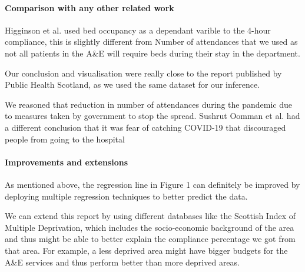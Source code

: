 \documentclass[11pt,a4paper]{article}
\begin{document}
\paragraph{Comparison with any other related work}
Higginson et al. \cite{higginson} used bed occupancy as a dependant varible to the 4-hour compliance, this is slightly different from Number of attendances that we used as not all patients in the A\&E will require beds during their stay in the department.

Our conclusion and visualisation were really close to the report published by Public Health Scotland, as we used the same dataset for our inference.

We reasoned that reduction in number of attendances during the pandemic due to measures taken by government to stop the spread. Sushrut Oomman et al. \cite{Oomman48} had a different conclusion that it was fear of catching COVID-19 that discouraged people from going to the hospital


\paragraph{Improvements and extensions}
As mentioned above, the regression line in Figure 1 can definitely be improved by deploying multiple regression techniques to better predict the data.

We can extend this report by using different databases like the Scottish Index of Multiple Deprivation\cite{SIMD}, which includes the socio-economic background of the area and thus might be able to better explain the compliance percentage we got from that area. For example, a less deprived area might have bigger budgets for the A\&E services and thus perform better than more deprived areas.
\end{document}
